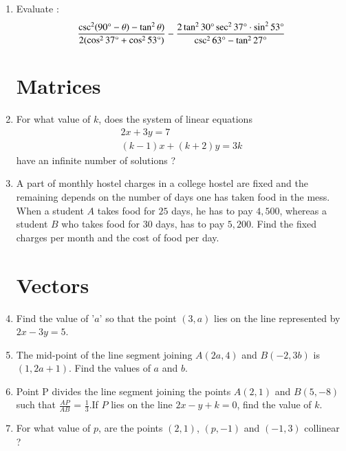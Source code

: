 \documentclass[2pt,-letter paper]{article}
\providecommand{\brak}[1]{\ensuremath{\left(#1\right)}}
\begin{document}
\begin{enumerate}
\item Evaluate :
\begin{align*}
    {\frac{\csc^2(90\degree - \theta)-\tan^2\theta)}{2(\cos^2 37\degree + \cos^2 53\degree)}} - {\frac{2\tan^2 30\degree \sec^2 37\degree \cdot \sin^2 53\degree}{\csc^2 63\degree - \tan^2 27\degree}} 
\end{align*}

\section{Matrices}

\item For what value of $k$, does the system of linear equations\\
\begin{align*}
   2x + 3y = 7\\
 \brak{k - 1} x + \brak{k + 2} y = 3k
\end{align*}
have an infinite number of solutions ?

\item A part of monthly hostel charges in a college hostel are fixed and the remaining depends on the number of days one has taken food in the mess. When a student $A$ takes food for $25$ days, he has to pay {\rupee $4,500$}, whereas a student $B$ who takes food for $30$ days, has to pay {\rupee $5,200$}. Find the fixed charges per month and the cost of food per day.

\section{Vectors}

\item Find the value of '$a$' so that the point $\brak{3, a}$ lies on the line represented
by $2 x - 3 y = 5$.

\item The mid-point of the line segment joining $A\brak{2a, 4}$ and $B\brak{-2, 3b}$ is $\brak{1, 2a + 1}$. Find the values of $a$ and $b$.

\item Point P divides the line segment joining the points $A\brak{2, 1}$ and $B\brak{5, -8}$ such that $\frac{AP}{AB}$ = $\frac{1}{3}$.If $P$ lies on the line $2x - y + k = 0$, find the value of $k$.

\item For what value of $p$, are the points $\brak{2, 1}$, $\brak{p,- 1}$ and $\brak{- 1, 3}$ collinear ?


\end{enumerate}
\end{document}
